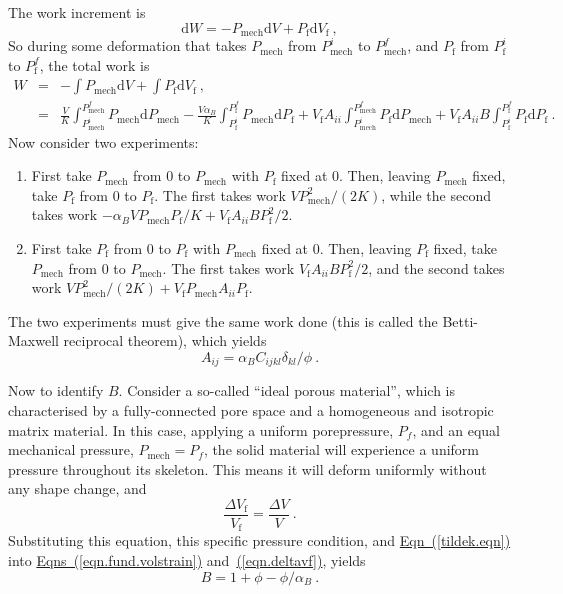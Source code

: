 \documentclass[12pt]{report}
\def\d{\mathrm{d}}
\def\mechpressure{P_{\mathrm{mech}}}
\begin{document}
The work increment is
\begin{equation}
\d W = -\mechpressure \d V + P_{\mathrm{f}} \d V_{\mathrm{f}} \ ,
\end{equation}
So during some deformation that takes $\mechpressure$ from
$\mechpressure^{i}$ to $\mechpressure^{f}$, and $P_{\mathrm{f}}$ from
$P_{\mathrm{f}}^{i}$ to $P_{\mathrm{f}}^{f}$, the total work is
\begin{eqnarray}
W & = & -\int \mechpressure\d V + \int P_{\mathrm{f}}\d V_{\mathrm{f}}
\ , \nonumber \\ & = &
\frac{V}{K}\int_{\mechpressure^{i}}^{\mechpressure^{f}}\mechpressure
\d \mechpressure -
\frac{V{\alpha_{B}}}{K}\int_{P_{\mathrm{f}}^{i}}^{P_{\mathrm{f}}^{f}}\mechpressure
\d P_{\mathrm{f}} +
V_{\mathrm{f}}A_{ii}\int_{\mechpressure^{i}}^{\mechpressure^{f}}P_{\mathrm{f}}
\d \mechpressure +
V_{\mathrm{f}}A_{ii}B\int_{P_{\mathrm{f}}^{i}}^{P_{\mathrm{f}}^{f}}
P_{\mathrm{f}} \d P_{\mathrm{f}} \ .
\end{eqnarray}
Now consider two experiments:
\begin{enumerate}
\item First take $\mechpressure$ from $0$ to $\mechpressure$ with
  $P_{\mathrm{f}}$ fixed at $0$.   Then,
  leaving $\mechpressure$ fixed, take $P_{\mathrm{f}}$ from $0$ to
  $P_{\mathrm{f}}$.  The first takes work $V\mechpressure^2/(2K)$,
  while the second takes work $-{\alpha_{B}} V\mechpressure P_{\mathrm{f}}/K +
  V_{\mathrm{f}}A_{ii}B P_{\mathrm{f}}^{2}/2$.
\item First take $P_{\mathrm{f}}$ from $0$ to $P_{\mathrm{f}}$ with
  $\mechpressure$ fixed at $0$.   Then,
  leaving $P_{\mathrm{f}}$ fixed, take $\mechpressure$ from $0$ to
  $\mechpressure$.  The first takes work
  $V_{\mathrm{f}}A_{ii}B P_{\mathrm{f}}^{2}/2$, and the
  second takes work  $V\mechpressure^{2}/(2K) +
  V_{\mathrm{f}}\mechpressure A_{ii}P_{\mathrm{f}}$.
\end{enumerate}
The two experiments must give the same work done (this is called the
Betti-Maxwell reciprocal theorem), which yields
\begin{equation}
A_{ij} = \alpha_{B} C_{ijkl}\delta_{kl}/\phi \ .
\label{tildek.eqn}
\end{equation}

Now to identify $B$.  Consider a so-called
``ideal porous material'', which is characterised by a fully-connected
pore space and a homogeneous and isotropic matrix material.  In this
case, applying a uniform porepressure, $P_{f}$, and an equal
mechanical pressure, $\mechpressure=P_{f}$, the solid material
will experience a uniform pressure throughout its skeleton.   This
means it will deform uniformly without any shape change, and
\begin{equation}
\frac{\Delta V_{\mathrm{f}}}{V_{\mathrm{f}}} = \frac{\Delta V}{V} \ .
\end{equation}
Substituting this equation, this specific pressure condition, and
\hyperref[tildek.eqn]{Eqn~(\ref*{tildek.eqn})} into
\hyperref[eqn.fund.volstrain]{Eqns~(\ref*{eqn.fund.volstrain})}
and~\hyperref[eqn.deltavf]{(\ref*{eqn.deltavf})}, yields
\begin{equation}
B = 1 + \phi - \phi/{\alpha_{B}} \ .
\end{equation}
\end{document}

